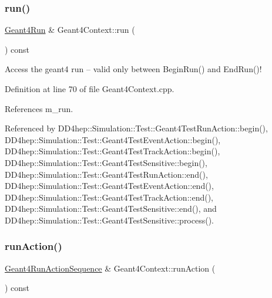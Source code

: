 \subsubsection{\texorpdfstring{run()}{run()}}
{\footnotesize\ttfamily \hyperlink{class_d_d4hep_1_1_simulation_1_1_geant4_run}{Geant4\+Run} \& Geant4\+Context\+::run (\begin{DoxyParamCaption}{ }\end{DoxyParamCaption}) const}



Access the geant4 run -- valid only between Begin\+Run() and End\+Run()! 



Definition at line 70 of file Geant4\+Context.\+cpp.



References m\+\_\+run.



Referenced by D\+D4hep\+::\+Simulation\+::\+Test\+::\+Geant4\+Test\+Run\+Action\+::begin(), D\+D4hep\+::\+Simulation\+::\+Test\+::\+Geant4\+Test\+Event\+Action\+::begin(), D\+D4hep\+::\+Simulation\+::\+Test\+::\+Geant4\+Test\+Track\+Action\+::begin(), D\+D4hep\+::\+Simulation\+::\+Test\+::\+Geant4\+Test\+Sensitive\+::begin(), D\+D4hep\+::\+Simulation\+::\+Test\+::\+Geant4\+Test\+Run\+Action\+::end(), D\+D4hep\+::\+Simulation\+::\+Test\+::\+Geant4\+Test\+Event\+Action\+::end(), D\+D4hep\+::\+Simulation\+::\+Test\+::\+Geant4\+Test\+Track\+Action\+::end(), D\+D4hep\+::\+Simulation\+::\+Test\+::\+Geant4\+Test\+Sensitive\+::end(), and D\+D4hep\+::\+Simulation\+::\+Test\+::\+Geant4\+Test\+Sensitive\+::process().

\hypertarget{class_d_d4hep_1_1_simulation_1_1_geant4_context_a09d7a2ebd9619cb941cbb079a3171113}{}\label{class_d_d4hep_1_1_simulation_1_1_geant4_context_a09d7a2ebd9619cb941cbb079a3171113} 
\subsubsection{\texorpdfstring{run\+Action()}{runAction()}}
{\footnotesize\ttfamily \hyperlink{class_d_d4hep_1_1_simulation_1_1_geant4_run_action_sequence}{Geant4\+Run\+Action\+Sequence} \& Geant4\+Context\+::run\+Action (\begin{DoxyParamCaption}{ }\end{DoxyParamCaption}) const}




